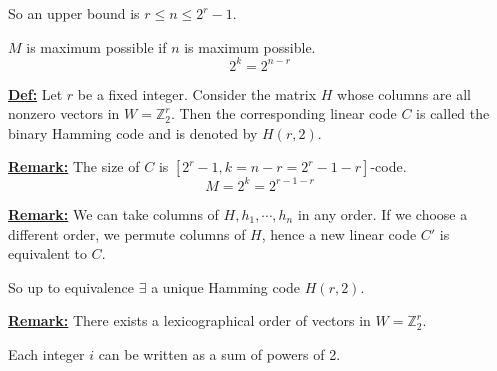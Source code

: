 \documentclass{article}
\renewcommand{\b}[1]{\textbf{#1}}
\newcommand{\ul}[1]{\underline{#1}}
\newcommand{\newdef}[2]{\b{\ul{#1:}} #2}
\begin{document}
So an upper bound is $r \leq n \leq 2^r - 1$.

$M$ is maximum possible if $n$ is maximum possible.
\[2^k = 2^{n-r}\]

\newdef{Def}{
	Let $r$ be a fixed integer. Consider the matrix $H$ whose columns are
	all nonzero vectors in $W = \mathbb{Z}^r_2$. Then the corresponding
	linear code $C$ is called the binary Hamming code and is denoted by
	$H(r, 2)$.
}

\newdef{Remark}{
	The size of $C$ is $[2^r - 1, k = n-r = 2^r - 1 - r]$-code.
	\[M = 2^k = 2^{r-1-r}\]
}

\newdef{Remark}{
	We can take columns of $H, h_1, \cdots, h_n$ in any order. If we choose
	a different order, we permute columns of $H$, hence a new linear code
	$C'$ is equivalent to $C$.

	So up to equivalence $\exists$ a unique Hamming code $H(r, 2)$.
}

\newdef{Remark}{
	There exists a lexicographical order of vectors in
	$W = \mathbb{Z}^r_2$.

	Each integer $i$ can be written as a sum of powers of 2.
}
\end{document}
